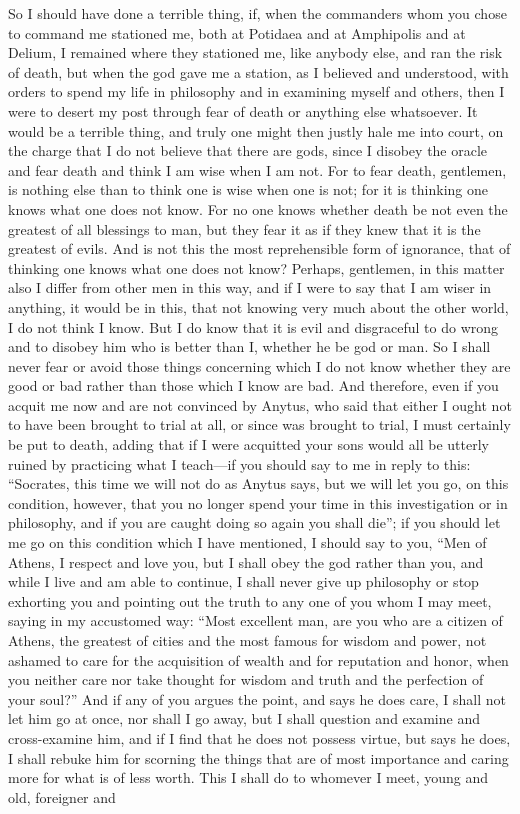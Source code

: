 So I should have done a terrible thing,  if, when the commanders whom you chose to command me stationed me, both at Potidaea and at Amphipolis and at Delium, I remained where they stationed me, like anybody else, and ran the risk of death, but when the god gave me a station, as I believed and understood, with orders to spend my life in philosophy and in examining myself and others,  then I were to desert my post through fear of death or anything else whatsoever. It would be a terrible thing, and truly one might then justly hale me into court, on the charge that I do not believe that there are gods, since I disobey the oracle and fear death and think I am wise when I am not. For to fear death, gentlemen, is nothing else than to think one is wise when one is not; for it is thinking one knows what one does not know. For no one knows whether death be not even the greatest of all blessings to man, but they fear it as if they knew that it is the greatest of evils.  And is not this the most reprehensible form of ignorance, that of thinking one knows what one does not know? Perhaps, gentlemen, in this matter also I differ from other men in this way, and if I were to say that I am wiser in anything, it would be in this, that not knowing very much about the other world, I do not think I know. But I do know that it is evil and disgraceful to do wrong and to disobey him who is better than I, whether he be god or man. So I shall never fear or avoid those things concerning which I do not know whether they are good or bad rather than those which I know are bad. And therefore, even if  you acquit me now and are not convinced by Anytus, who said that either I ought not to have been brought to trial at all, or since was brought to trial, I must certainly be put to death, adding that if I were acquitted your sons would all be utterly ruined by practicing what I teach—if you should say to me in reply to this: “Socrates, this time we will not do as Anytus says, but we will let you go, on this condition, however, that you no longer spend your time in this investigation or in philosophy, and if you are caught doing so again you shall die”;  if you should let me go on this condition which I have mentioned, I should say to you, “Men of Athens, I respect and love you, but I shall obey the god rather than you, and while I live and am able to continue, I shall never give up philosophy or stop exhorting you and pointing out the truth to any one of you whom I may meet, saying in my accustomed way: “Most excellent man, are you who are a citizen of Athens, the greatest of cities and the most famous for wisdom and power, not ashamed to care for the acquisition of wealth  and for reputation and honor, when you neither care nor take thought for wisdom and truth and the perfection of your soul?” And if any of you argues the point, and says he does care, I shall not let him go at once, nor shall I go away, but I shall question and examine and cross-examine him, and if I find that he does not possess virtue, but says he does, I shall rebuke him for scorning  the things that are of most importance and caring more for what is of less worth. This I shall do to whomever I meet, young and old, foreigner and 